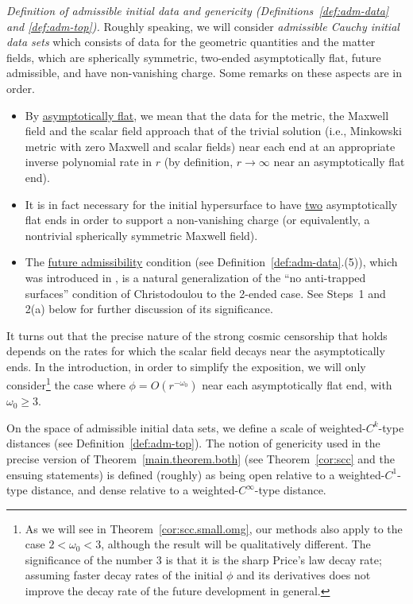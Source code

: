 \documentclass[10pt, reqno]{amsart}
\theoremstyle{definition}
\theoremstyle{remark}
\numberwithin{equation}{section}
\newcommand{\0}{\emptyset}
\newcommand{\omg}{\omega}
\newcommand{\pfstep}[1]{\vspace{.5em} {\it \noindent #1.}}
\begin{document}
\pfstep{Definition of admissible initial data and genericity (Definitions~\ref{def:adm-data} and \ref{def:adm-top})}
Roughly speaking, we will consider \emph{admissible Cauchy initial data sets} which consists of data for the geometric quantities and the matter fields, which are spherically symmetric, two-ended asymptotically flat, future admissible, and have non-vanishing charge. Some remarks on these aspects are in order.
\begin{itemize}
\item By \underline{asymptotically flat}, we mean that the data for the metric, the Maxwell field and the scalar field approach that of the trivial solution (i.e., Minkowski metric with zero Maxwell and scalar fields) near each end at an appropriate inverse polynomial rate in $r$ (by definition, $r \to \infty$ near an asymptotically flat end).
\item It is in fact necessary for the initial hypersurface to have \underline{two} asymptotically flat ends in order to support a non-vanishing charge (or equivalently, a nontrivial spherically symmetric Maxwell field). 
\item The \underline{future admissibility} condition (see Definition~\ref{def:adm-data}.(5)), which was introduced in \cite{D3}, is a natural generalization of the ``no anti-trapped surfaces'' condition of Christodoulou to the 2-ended case. See Steps~1 and 2(a) below for further discussion of its significance.
\end{itemize}
It turns out that the precise nature of the strong cosmic censorship that holds depends on the rates for which the scalar field decays near the asymptotically ends. In the introduction, in order to simplify the exposition, we will only consider\footnote{As we will see in Theorem~\ref{cor:scc.small.omg}, our methods also apply to the case $2 < \omg_{0} < 3$, although the result will be qualitatively different. The significance of the number $3$ is that it is the sharp Price's law decay rate; assuming faster decay rates of the initial $\phi$ and its derivatives does not improve the decay rate of the future development in general.} the case where $\phi = O(r^{-\omg_{0}})$ near each asymptotically flat end, with $\omg_0\geq 3$.

On the space of admissible initial data sets, we define a scale of weighted-$C^{k}$-type distances (see Definition~\ref{def:adm-top}). The notion of genericity used in the precise version of Theorem~\ref{main.theorem.both} (see Theorem~\ref{cor:scc} and the ensuing statements) is defined (roughly) as being open relative to a weighted-$C^{1}$-type distance, and dense relative to a weighted-$C^{\infty}$-type distance. 
\end{document}
